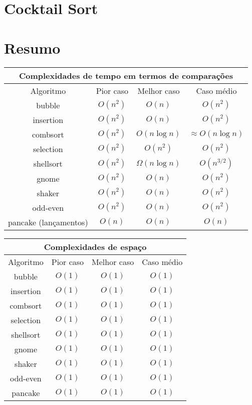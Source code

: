 \section{Cocktail Sort}

\section{Resumo}

\begin{center}
\begin{tabular}{||c|c|c|c||}
\hline
\multicolumn{4}{|c|}{Complexidades de tempo em termos de comparações} \\
\hline
Algoritmo & Pior caso & Melhor caso & Caso médio \\
\hline
bubble      & $O(n^2)$       & $O(n)$          & $O(n^2)$ \\
insertion   & $O(n^2)$       & $O(n)$          & $O(n^2)$ \\
combsort    & $O(n^2)$       & $O(n\log n)$    & $\approx O(n \log n)$ \\
selection   & $O(n^2)$       & $O(n^2)$        & $O(n^2)$ \\
shellsort   & $O(n^2)$       & $\Omega(n\log n)$ & $O(n^{3/2})$ \\
gnome       & $O(n^2)$       & $O(n)$          & $O(n^2)$ \\
shaker      & $O(n^2)$       & $O(n)$          & $O(n^2)$ \\
odd-even    & $O(n^2)$       & $O(n)$          & $O(n^2)$ \\
pancake (lançamentos)     & $O(n)$  & $O(n)$  & $O(n)$  \\
\hline
\end{tabular}
\end{center}

\begin{center}
\begin{tabular}{||c|c|c|c||}
\hline
\multicolumn{4}{|c|}{Complexidades de espaço} \\
\hline
Algoritmo & Pior caso & Melhor caso & Caso médio \\
\hline
bubble      & $O(1)$ & $O(1)$ & $O(1)$ \\
insertion   & $O(1)$ & $O(1)$ & $O(1)$ \\
combsort    & $O(1)$ & $O(1)$ & $O(1)$ \\
selection   & $O(1)$ & $O(1)$ & $O(1)$ \\
shellsort   & $O(1)$ & $O(1)$ & $O(1)$ \\
gnome       & $O(1)$ & $O(1)$ & $O(1)$ \\
shaker      & $O(1)$ & $O(1)$ & $O(1)$ \\
odd-even    & $O(1)$ & $O(1)$ & $O(1)$ \\
pancake     & $O(1)$ & $O(1)$ & $O(1)$ \\
\hline
\end{tabular}
\end{center}




